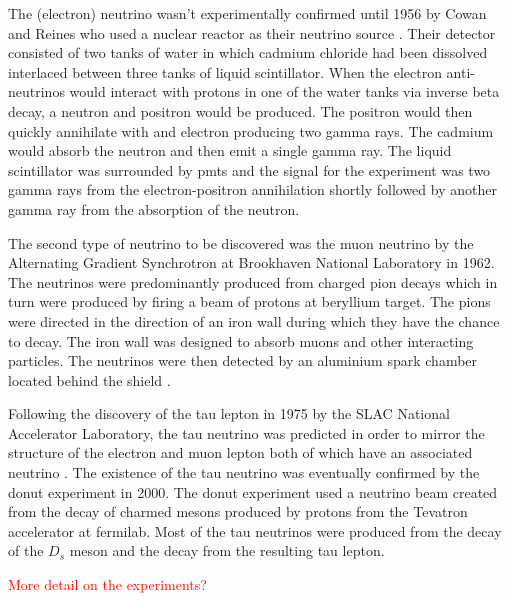The (electron) neutrino wasn't experimentally confirmed until 1956 by Cowan and Reines who used a nuclear reactor as their neutrino source \cite{cowan_and_reines_paper}. Their detector consisted of two tanks of water in which cadmium chloride had been dissolved interlaced between three tanks of liquid scintillator. When the electron anti-neutrinos would interact with protons in one of the water tanks via inverse beta decay, a neutron and positron would be produced. The positron would then quickly annihilate with and electron producing two gamma rays. The cadmium would absorb the neutron and then emit a single gamma ray. The liquid scintillator was surrounded by \Glspl{pmt} and the signal for the experiment was two gamma rays from the electron-positron annihilation shortly followed by another gamma ray from the absorption of the neutron.

The second type of neutrino to be discovered was the muon neutrino by the Alternating Gradient Synchrotron at Brookhaven National Laboratory in 1962. The neutrinos were predominantly produced from charged pion decays which in turn were produced by firing a beam of protons at beryllium target. The pions were directed in the direction of an iron wall during which they have the chance to decay. The iron wall was designed to absorb muons and other interacting particles. The neutrinos were then detected by an aluminium spark chamber located behind the shield \cite{Muon_neutrino_discovery}. 

Following the discovery of the tau lepton in 1975 by the SLAC National Accelerator Laboratory, the tau neutrino was predicted in order to mirror the structure of the electron and muon lepton both of which have an associated neutrino \cite{tau_lepton_discovery}. The existence of the tau neutrino was eventually confirmed by the \Gls{donut} experiment in 2000. The \Gls{donut} experiment used a neutrino beam created from the decay of charmed mesons produced by protons from the  Tevatron accelerator at \gls{fermilab}. Most of the tau neutrinos were produced from the decay of the $D_s$ meson and the decay from the resulting tau lepton.

\textcolor{red}{More detail on the experiments?}

